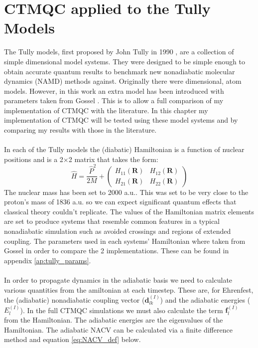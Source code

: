 \chapter{CTMQC applied to the Tully Models}
\label{chap:tully_models}

The Tully models, first proposed by John Tully in 1990 \cite{tully_molecular_1990}, are a collection of simple  dimensional model systems. They were designed to be simple enough to obtain accurate quantum results to benchmark new nonadiabatic molecular dynamics (NAMD) methods against. Originally there were  dimensional,  atom models. However, in this work an extra model has been introduced with parameters taken from Gossel \cite{gossel_coupled-trajectory_2018}. This is to allow a full comparison of my implementation of CTMQC with the literature. In this chapter my implementation of CTMQC will be tested using these model systems and by comparing my results with those in the literature.
\\\\
In each of the Tully models the (diabatic) Hamiltonian is a function of nuclear positions  and is a 2$\times$2 matrix that takes the form:
\begin{equation}
  \hat{H} = \frac{\ \hat{P} ^2}{2M} + \left(
                                              \begin{array}{cc}
                                                H_{11}(\mathbf{R}) & H_{12}(\mathbf{R}) \\
                                                H_{21}(\mathbf{R}) & H_{22}(\mathbf{R})
                                              \end{array}
                                         \right)
\end{equation}
The nuclear mass has been set to 2000 a.u.. This was set to be very close to the proton's mass of 1836 a.u. so we can expect significant quantum effects that classical theory couldn't replicate. The values of the Hamiltonian matrix elements are set to produce systems that resemble common features in a typical nonadiabatic simulation such as avoided crossings and regions of extended coupling. The parameters used in each systems' Hamiltonian where taken from Gossel \cite{gossel_coupled-trajectory_2018} in order to compare the 2 implementations. These can be found in appendix \ref{ap:tully_params}.
\\\\
In order to propagate dynamics in the adiabatic basis we need to calculate various quantities from the amiltonian at each timestep. These are, for Ehrenfest, the (adiabatic) nonadiabatic coupling vector ($\mathbf{d}_{lk}^{(I)}$) and the adiabatic energies ($E_{l}^{(I)}$). In the full CTMQC simulations we must also calculate the   term $\mathbf{f}_{l}^{(I)}$ from the Hamiltonian. The adiabatic energies are the eigenvalues of the Hamiltonian. The adiabatic NACV can be calculated via a finite difference method and equation \eqref{eq:NACV_def} below.
